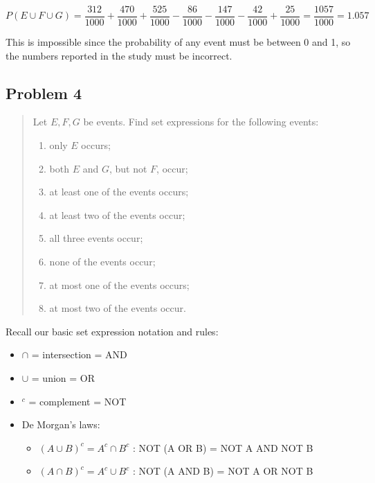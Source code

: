 \documentclass[10pt]{article}
\begin{document}
\begin{equation}
	P(E \cup F \cup G) = \frac{312}{1000} + \frac{470}{1000} + \frac{525}{1000} - \frac{86}{1000} - \frac{147}{1000} - \frac{42}{1000} + \frac{25}{1000} = \frac{1057}{1000} = 1.057
\end{equation}

This is impossible since the probability of any event must be between 0 and 1, so the numbers reported in the study must be incorrect.

\subsection*{Problem 4}
\begin{quote}
	Let $E,F,G$ be events. Find set expressions for the following events:
	\begin{enumerate}[label=(\alph*)]
		\item only $E$ occurs;
		\item both $E$ and $G$, but not $F$, occur;
		\item at least one of the events occurs;
		\item at least two of the events occur;
		\item all three events occur;
		\item none of the events occur;
		\item at most one of the events occurs;
		\item at most two of the events occur.
	\end{enumerate}
\end{quote}

\divider

Recall our basic set expression notation and rules:
\begin{itemize}
	\item $\cap$ = intersection = AND
	\item $\cup$ = union = OR
	\item $^c$ = complement = NOT
	\item De Morgan's laws:
	      \begin{itemize}
		      \item $(A \cup B)^c = A^c \cap B^c$ : NOT (A OR B) = NOT A AND NOT B
		      \item $(A \cap B)^c = A^c \cup B^c$ : NOT (A AND B) = NOT A OR NOT B
	      \end{itemize}
\end{itemize}
\end{document}
